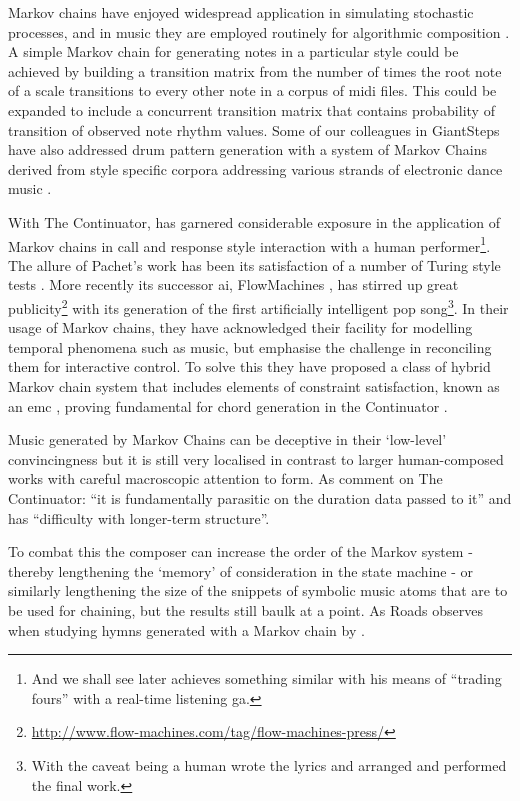 Markov chains have enjoyed widespread application in simulating stochastic processes, and in music they are employed routinely for algorithmic composition \citep{Fernandez2013, Eigenfeldt2009, Jorda2016}. A simple Markov chain for generating notes in a particular style could be achieved by building a transition matrix from the number of times the root note of a scale transitions to every other note in a corpus of \acrshort{midi} files. This could be expanded to include a concurrent transition matrix that contains probability of transition of observed note rhythm values. Some of our colleagues in GiantSteps have also addressed drum pattern generation with a system of Markov Chains derived from style specific corpora addressing various strands of electronic dance music \cite{Jorda2016, Gomez-Marin2016}.

With The Continuator, \cite{Pachet2002} has garnered considerable exposure in the application of Markov chains in call and response style interaction with a human performer\footnote{And we shall see later \cite{Biles1994} achieves something similar with his means of ``trading fours'' with a real-time listening \acrshort{ga}.}. The allure of Pachet's work has been its satisfaction of a number of Turing style tests \citep{Pachet2008}. More recently its successor \acrshort{ai}, FlowMachines \citep{Pachet2008a}, has stirred up great publicity\footnote{\url{http://www.flow-machines.com/tag/flow-machines-press/}} with its generation of the first artificially intelligent pop song\footnote{With the caveat being a human wrote the lyrics and arranged and performed the final work.}. In their usage of Markov chains, they have acknowledged their facility for modelling temporal phenomena such as music, but emphasise the challenge in reconciling them for interactive control. To solve this they have proposed a class of hybrid Markov chain system that includes elements of constraint satisfaction, known as an \acrfull{emc} \citep{Pachet2011}, proving fundamental for chord generation in the Continuator \citep{pachet2001finite, barbieri2012markov}.

Music generated by Markov Chains can be deceptive in their `low-level' convincingness but it is still very localised in contrast to larger human-composed works with careful macroscopic attention to form. As \cite{Collins2011a} comment on The Continuator: ``it is fundamentally parasitic on the duration data passed to it'' and has ``difficulty with longer-term structure''.

To combat this the composer can increase the order of the Markov system - thereby lengthening the `memory' of consideration in the state machine - or similarly lengthening the size of the snippets of symbolic music atoms that are to be used for chaining, but the results still baulk at a point. As Roads observes when studying hymns generated with a Markov chain by \cite{Brooks1993}. 


